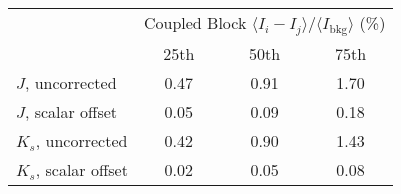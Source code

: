 \begin{tabular}{lccc}
& \multicolumn{3}{c}{Coupled Block
$\langle I_i - I_j\rangle / \langle I_\mathrm{bkg} \rangle$ (\%)} \\
& 25th & 50th & 75th \\
\hline
$J$, uncorrected & 0.47 & 0.91 & 1.70 \\
$J$, scalar offset & 0.05 & 0.09 & 0.18 \\
\hline
$K_s$, uncorrected & 0.42 & 0.90 & 1.43 \\
$K_s$, scalar offset & 0.02 & 0.05 & 0.08 \\
\hline
\end{tabular}
